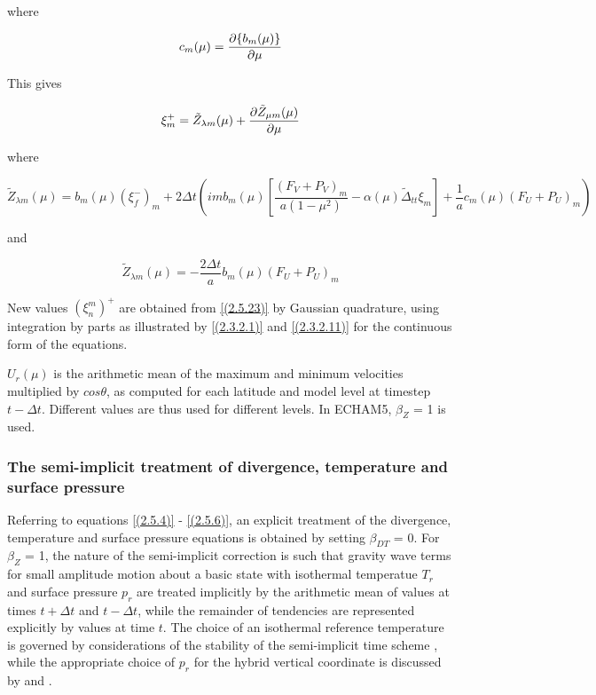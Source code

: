where

\begin{equation}
c_m (\mu) = \frac {\partial \{b_m (\mu)\}} {\partial \mu}
\label{(2.5.22)}
\end{equation}

This gives

\begin{equation}
\xi^+_m = \tilde{Z}_{\lambda m} (\mu) + \frac {\partial \tilde{Z}_{\mu m} (\mu)} {\partial \mu}
\label{(2.5.23)}
\end{equation}

where

\begin{equation}
\tilde{Z}_{\lambda m} (\mu) = b_m (\mu) (\xi^-_f)_m\nonumber
+   2 \Delta t  \left(imb_m(\mu)\left[\frac{(F_V+P_V)_m}{a(1-\mu^2)}
- \alpha (\mu)\tilde \Delta_{tt}\xi_m\right]
 + \frac{1}{a}c_m(\mu)(F_U+P_U)_m\right)
\label{(2.5.24)}
\end{equation}

and

\begin{equation}
\tilde{Z}_{\lambda m} (\mu) = -\frac{2 \Delta t}{a}b_m (\mu) (F_U+P_U)_m
\label{(2.5.25)}
\end{equation}

New values $(\xi^m_n)^+$ are obtained from \ref{(2.5.23)} by Gaussian
quadrature,
         using integration by parts as illustrated by \ref{(2.3.2.1)} and
         \ref{(2.3.2.11)} for the continuous form of the equations.


$U_r(\mu)$ is the arithmetic mean of the maximum and minimum
velocities multiplied by $cos\theta$, as computed for each latitude
and model level at timestep $t-\Delta t$. Different values are thus
used for different levels. In ECHAM5, $\beta_{Z}$ = 1 is used.

\subsubsection{The semi-implicit treatment of divergence, temperature and surface
            pressure}

Referring to equations \ref{(2.5.4)} - \ref{(2.5.6)}, an explicit
treatment of the divergence, temperature and surface pressure
equations is obtained by setting $\beta_{DT}$ = 0. For $\beta_{Z}$ =
1, the nature of the semi-implicit correction is such that gravity
wave terms for small amplitude motion about a basic state with
isothermal temperatue $T_r$ and surface pressure $p_r$ are treated
implicitly by the arithmetic mean of values at times $t+\Delta t$ and
$t-\Delta t$, while the remainder of tendencies are represented
explicitly by values at time $t$. The choice of an isothermal
reference temperature is governed by considerations of the stability
of the semi-implicit time scheme \cite[]{simmons78}, while the
appropriate choice of $p_r$ for the hybrid vertical coordinate is
discussed by \cite{simmons81a} and \cite{simmons81b}.

